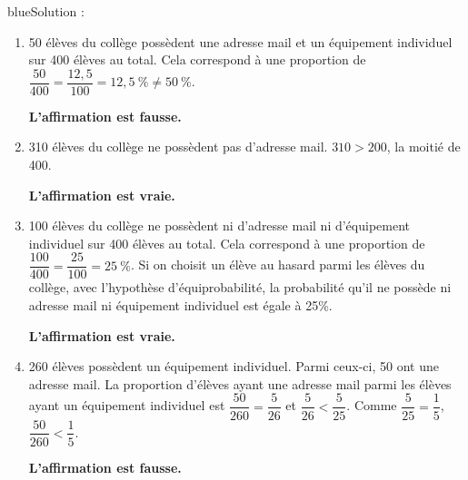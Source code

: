 \documentclass[10pt]{article}
\begin{document}
\begin{color}{blue}Solution :\par

\begin{enumerate}
\item
50 élèves du collège possèdent une adresse mail et un équipement individuel sur 400 élèves au total. Cela correspond à une proportion de $\dfrac{50}{400} = \dfrac{12,5}{100} = 12,5~\% \neq 50~\% $.

\textbf{L'affirmation est fausse.}

\item 
310 élèves du collège ne possèdent pas d'adresse mail. $310>200$, la moitié de 400.

\textbf{L'affirmation est vraie.}
\item 

100 élèves du collège ne possèdent ni d'adresse mail ni d'équipement individuel sur 400 élèves au total. Cela correspond à une proportion de $\dfrac{100}{400} = \dfrac{25}{100} = 25~\% $. Si on choisit un élève au hasard parmi les élèves du collège, avec l'hypothèse d'équiprobabilité, la probabilité qu'il ne possède ni adresse mail ni équipement individuel est égale à 25\%.

\textbf{L'affirmation est vraie.}
\item 

260 élèves possèdent un équipement individuel. Parmi ceux-ci, 50 ont une adresse mail. La proportion d'élèves ayant une adresse mail parmi les élèves ayant un équipement individuel est $\dfrac{50}{260}=\dfrac{5}{26}$ et $\dfrac{5}{26}<\dfrac{5}{25}$. Comme $\dfrac{5}{25}=\dfrac{1}{5}$, $\dfrac{50}{260}<\dfrac{1}{5}$.

\textbf{L'affirmation est fausse.}

\end{enumerate}

\end{color}
\end{document}
